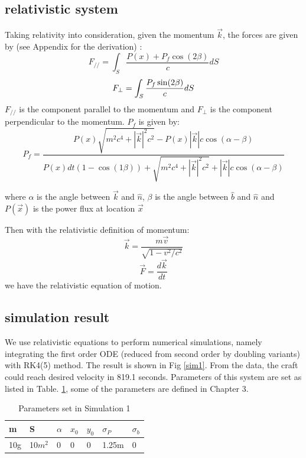 \documentclass{article}
\begin{document}
\subsection{relativistic system}
Taking relativity into consideration, given the momentum $\vec{k}$, the forces are given by (see Appendix for the derivation) :
\begin{equation}
	F_{//}=\int_S \frac{P(x) +P_f \cos (2\beta) }{c} dS 
\end{equation}
\begin{equation}
	F_{\perp}=\int_S \frac{P_f \sin (2\beta)}{c} dS \\
\end{equation}
$F_{//}$ is the component parallel to the momentum and $F_\perp$ is the component perpendicular to the momentum.
$P_f$ is given by:
\begin{equation}
	P_f=\frac{P(x) \sqrt{m^2c^4+|\vec{k}|^2c^2 } - P(x)|\vec{k}|c \cos(\alpha- \beta) }{P(x)dt (1-\cos(1\beta)) +\sqrt{m^2c^4+|\vec{k}|^2c^2 } + |\vec{k}|c \cos(\alpha- \beta) }
\end{equation}

where $\alpha$ is the angle between $\vec{k}$ and $\hat{n}$, $\beta$ is the angle between $\hat{b}$ and $\hat{n}$ and $P(\vec x)$ is the power flux at location $\vec x$

Then with the relativistic definition of momentum:
\begin{equation}
	\vec k = \frac{m \vec v}{\sqrt{1-v^2/c^2}}
\end{equation}
\begin{equation}
	\vec{F} = \frac{d \vec k}{dt}
\end{equation}
we have the relativistic equation of motion. 

\subsection{simulation result}
We use relativistic equations to perform numerical simulations, namely integrating the first order ODE (reduced from second order by doubling variants) with RK4(5) method. The result is shown in Fig \ref{sim1}. From the data, the craft could reach desired velocity in 819.1 seconds. Parameters of this system are set as listed in Table. \ref{par1}, some of the parameters are defined in Chapter 3.

\begin{table}[!htb]
	\centering
	\label{par1}
	\caption{Parameters set in Simulation 1}
	\begin{tabular}{lllllll}
		\toprule
		m	&S	&$\alpha$	&$x_0$	&$y_0$	&$\sigma_P$	&$\sigma_b$\\
		\midrule
		10g	&10$m^2$	&0	&0	&0	&1.25m	&0\\
		\bottomrule
		
	\end{tabular}
\end{table}
\end{document}
